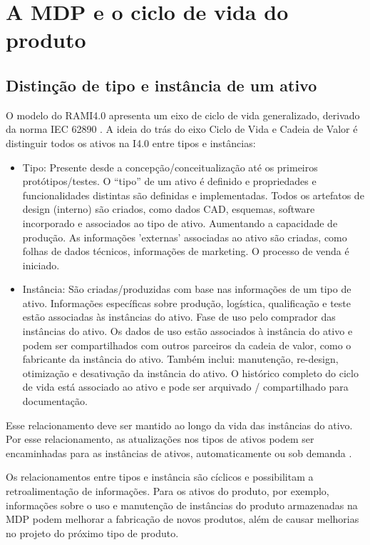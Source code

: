 \chapter{A MDP e o ciclo de vida do produto}

\section{Distinção de tipo e instância de um ativo}

	O modelo do RAMI4.0 apresenta um eixo de ciclo de vida generalizado, derivado da norma IEC 62890 \cite{adolphs2015rami}. A ideia do trás do eixo Ciclo de Vida e Cadeia de Valor é distinguir todos os ativos na I4.0 entre tipos e instâncias:
	
	\begin{itemize}
	  \item Tipo: Presente desde a concepção/conceitualização até os primeiros protótipos/testes. O ``tipo'' de um ativo é definido e propriedades e funcionalidades distintas são definidas e implementadas. Todos os artefatos de design (interno) são criados, como dados CAD, esquemas, software incorporado e associados ao tipo de ativo. Aumentando a capacidade de produção. As informações 'externas' associadas ao ativo são criadas, como folhas de dados técnicos, informações de marketing. O processo de venda é iniciado.
	  
	  \item Instância: São criadas/produzidas com base nas informações de um tipo de ativo. Informações específicas sobre produção, logística, qualificação e teste estão associadas às instâncias do ativo. Fase de uso pelo comprador das instâncias do ativo. Os dados de uso estão associados à instância do ativo e podem ser compartilhados com outros parceiros da cadeia de valor, como o fabricante da instância do ativo.
	  Também inclui: manutenção, re-design, otimização e desativação da instância do ativo. O histórico completo do ciclo de vida está associado ao ativo e pode ser arquivado / compartilhado para documentação.
	  
	\end{itemize}

	Esse relacionamento deve ser mantido ao longo da vida das instâncias do ativo. Por esse relacionamento, as atualizações nos tipos de ativos podem ser encaminhadas para as instâncias de ativos, automaticamente ou sob demanda \cite{bader2019aas}.
	
	Os relacionamentos entre tipos e instância são cíclicos e possibilitam a retroalimentação de informações. Para os ativos do produto, por exemplo, informações sobre o uso e manutenção de instâncias do produto armazenadas na MDP podem melhorar a fabricação de novos produtos, além de causar melhorias no projeto do próximo tipo de produto.
	

